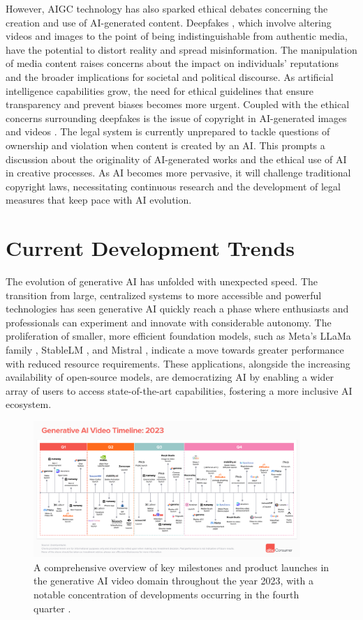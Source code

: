 \documentclass[11pt,a4paper,oneside]{report}
\begin{document}
However, AIGC technology has also sparked ethical debates concerning the creation and use of AI-generated content. 
Deepfakes \cite{westerlund2019emergence}, which involve altering videos and images to the point of being indistinguishable from authentic media, have the potential to distort reality and spread misinformation. 
The manipulation of media content raises concerns about the impact on individuals' reputations and the broader implications for societal and political discourse. 
As artificial intelligence capabilities grow, the need for ethical guidelines that ensure transparency and prevent biases becomes more urgent.
Coupled with the ethical concerns surrounding deepfakes is the issue of copyright in AI-generated images and videos \cite{hristov2016artificial}.
The legal system is currently unprepared to tackle questions of ownership and violation when content is created by an AI. 
This prompts a discussion about the originality of AI-generated works and the ethical use of AI in creative processes. 
As AI becomes more pervasive, it will challenge traditional copyright laws, necessitating continuous research and the development of legal measures that keep pace with AI evolution.


\section{Current Development Trends}

The evolution of generative AI has unfolded with unexpected speed.
The transition from large, centralized systems to more accessible and powerful technologies has seen generative AI quickly reach a phase where enthusiasts and professionals can experiment and innovate with considerable autonomy. 
The proliferation of smaller, more efficient foundation models, such as Meta's LLaMa family \cite{touvron2023llama}, StableLM \cite{StabilityAI_StableLM}, and Mistral \cite{jiang2023mistral}, indicate a move towards greater performance with reduced resource requirements. 
These applications, alongside the increasing availability of open-source models, are democratizing AI by enabling a wider array of users to access state-of-the-art capabilities, fostering a more inclusive AI ecosystem.

\begin{figure}[htbp]
  \centering
  \includegraphics[width=0.9\textwidth]{timeline.png}
  \caption{A comprehensive overview of key milestones and product launches in the generative AI video domain throughout the year 2023, with a notable concentration of developments occurring in the fourth quarter \cite{a16zAI2023}.}
\end{figure}
\end{document}

